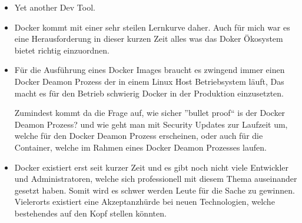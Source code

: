 \begin{itemize}

\item Yet another Dev Tool.

\item Docker kommt mit einer sehr steilen Lernkurve daher. Auch für mich war es eine Herausforderung
in dieser kurzen Zeit alles was das Doker Ökosystem bietet richtig einzuordnen.

\item Für die Ausführung eines Docker Images braucht es zwingend immer einen Docker Deamon Prozess der
in einem Linux Host Betriebsystem läuft, Das macht es für den Betrieb schwierig Docker in der
Produktion einzusetzten.

Zumindest kommt da die Frage auf, wie sicher ”bullet proof“ is der Docker Deamon Prozess? und wie
geht man mit Security Updates zur Laufzeit um, welche für den Docker Deamon Prozess erscheinen,
oder auch für die Container, welche im Rahmen eines Docker Deamon Prozesses laufen.

\item Docker existiert erst seit kurzer Zeit und es gibt noch nicht viele Entwickler und
Administratoren, welche sich professionell mit diesem Thema auseinander gesetzt haben. Somit wird
es schwer werden Leute für die Sache zu gewinnen. Vielerorts existiert eine Akzeptanzhürde bei
neuen Technologien, welche bestehendes auf den Kopf stellen könnten.

\end{itemize}